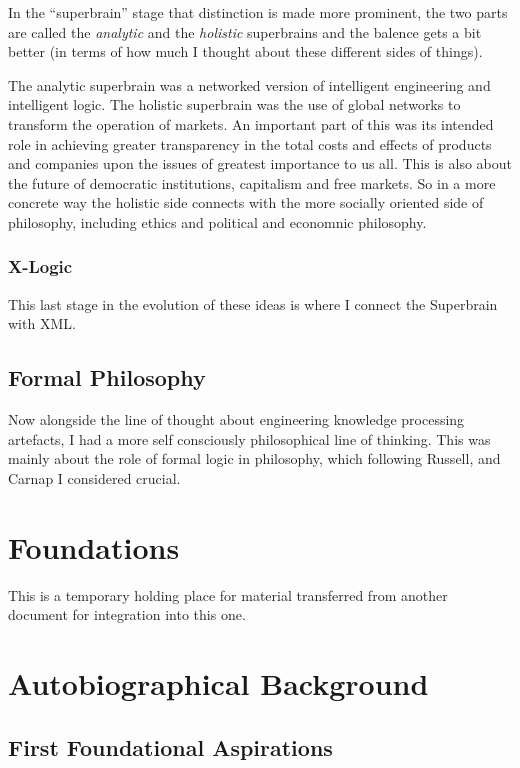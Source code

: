 \documentclass[10pt,titlepage]{book}
\begin{document}
In the ``superbrain'' stage that distinction is made more prominent, the two parts are called the {\it analytic} and the {\it holistic} superbrains and the balence gets a bit better (in terms of how much I thought about these different sides of things).

The analytic superbrain was a networked version of intelligent engineering and intelligent logic.
The holistic superbrain was the use of global networks to transform the operation of markets.
An important part of this was its intended role in achieving greater transparency in the total costs and effects of products and companies upon the issues of greatest importance to us all.
This is also about the future of democratic institutions, capitalism and free markets.
So in a more concrete way the holistic side connects with the more socially oriented side of philosophy, including ethics and political and economnic philosophy.

\subsection{X-Logic}

This last stage in the evolution of these ideas is where I connect the Superbrain with XML.

\section{Formal Philosophy}

Now alongside the line of thought about engineering knowledge processing artefacts, I had a more self consciously philosophical line of thinking.
This was mainly about the role of formal logic in philosophy, which following Russell, and Carnap I considered crucial.

\appendix

\chapter{Foundations}

This is a temporary holding place for material transferred from another document for integration into this one.

\chapter{Autobiographical Background}

\section{First Foundational Aspirations}
\end{document}
